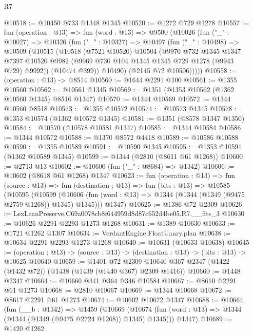 \begin{lexlean}{R7}
\begin{coremodule}
@10518 := @10450 @733 @1348 @1345
@10520 := @1272 @729 @1278
@10557 := fun (operation : @13) =>
  fun (word : @13) =>
  @9500
    (@10026
      (fun ("_" : @10027) =>
      @10326
        (fun ("_" : @10327) =>
        @10497
          (fun ("_" : @10498) =>
          @10509
            (@10515
              (@10518
                (@7521 @10520)
                @10504
                (@9970
                  @732
                  @1345
                  @1347
                  @7397
                  @10520
                  @9982
                  (@9969 @730 @104 @1345 @1345 @729 @1278 (@9943 @729) @9992))
                (@10474 @399))
              @10490)
            (@2145 @72 @10506)))))
@10558 := (operation : @13) -> @8514
@10560 := @1644 @2291 @100
@10561 := @1355 @10560
@10562 := @10561 @1345
@10569 := @1351 (@1353 @10562 (@1362 @10560 @1345) @8516 @1347)
@10570 := @1344 @10569
@10572 := @1344 @10560 @8518
@10573 := @1355 @10572
@10574 := @10573 @1345
@10578 := @1353 @10574 (@1362 @10572 @1345)
@10581 := @1351 (@8578 @1347 @1350)
@10584 := @10570 (@10578 @10581 @1347)
@10585 := @1344 @10584
@10586 := @1344 @10572
@10588 := @1370 @8572 @4418
@10589 := @10586 @10588
@10590 := @1355 @10589
@10591 := @10590 @1345
@10595 := @1353 @10591 (@1362 @10589 @1345)
@10599 := @1344 (@2810 (@8611 @61 @1268))
@10600 := @2713 @13
@10602 := @10600 (fun ("_" : @8684) => @1342)
@10606 := @10602 (@8618 @61 @1268) @1347
@10623 := fun (operation : @13) =>
  fun (source : @13) =>
  fun (destination : @13) =>
  fun (bits : @13) =>
  @10585
    (@10595
      (@10599 (@10606 (fun (word : @13) => @1344 (@1344 (@1349 (@9475 @2759 @1268)) @1345) @1345)))
      @1347)
@10625 := @1386 @72 @2309
@10626 := LexLeanPreserve.C69a0078cb8f644959d8d87c652d4be05.R7.__fits_3
@10630 := @10626 @2291 @2293 @1273 @1268
@10631 := @1389 @10630
@10633 := @1721 @1262 @1307
@10634 := VerdantEngine.FloatUnary.plan
@10638 := @10634 @2291 @2293 @1273 @1268
@10640 := @10631 (@10633 @10638)
@10645 := (operation : @13) ->
  (source : @13) -> (destination : @13) -> (bits : @13) -> @10625 @10640
@10659 := @1401
    @72
    @2309
    @10640
    @367
    @2347
    (@1422 (@1432 @72))
    (@1438 (@1439 (@1440 @367) @2309 @1416))
@10660 := @1448 @2347
@10664 := @10660 @341 @364 @346 @10584
@10667 := @8610 @2291 @61 @1273
@10668 := @2810 @10667
@10669 := @1344 @10668
@10672 := @8617 @2291 @61 @1273
@10674 := @10602 @10672 @1347
@10688 := @10664
    (fun (__b : @1342) =>
    @1459
      (@10669 (@10674 (fun (word : @13) => @1344 (@1344 (@1349 (@9475 @2724 @1268)) @1345) @1345)))
      @1347)
@10689 := @1420 @1262

\end{coremodule}
\end{lexlean}
